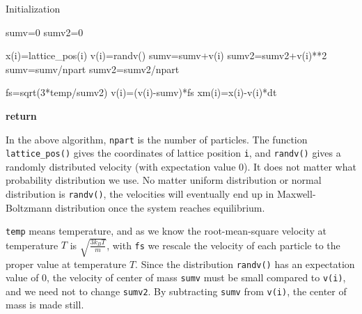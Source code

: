 \documentclass[letterpaper,12pt]{article}
\numberwithin{equation}{section}
\begin{document}
\begin{algorithm}[H]
    \caption{Initialization}
    \begin{algorithmic}[1] %

    
    \State sumv=0 
    \State sumv2=0 

      
        \State x(i)=lattice\_pos(i) 
        \State v(i)=randv() 
        \State sumv=sumv+v(i) 
        \State sumv2=sumv2+v(i)**2 
        \EndFor
        \State sumv=sumv/npart   
        \State sumv2=sumv2/npart 
    \EndProcedure

        \State fs=sqrt(3*temp/sumv2)    
            \State v(i)=(v(i)-sumv)*fs  
            \State xm(i)=x(i)-v(i)*dt  
        \EndFor
    \EndProcedure

    \State \textbf{return}
    \EndFunction
    \end{algorithmic}
\end{algorithm}
In the above algorithm, \texttt{npart} is the number of particles. The function \texttt{lattice\_pos()} gives the coordinates of lattice position \texttt{i}, and \texttt{randv()} gives a randomly distributed velocity (with expectation value 0). It does not matter what probability distribution we use. No matter uniform distribution or normal distribution is \texttt{randv()}, the velocities will eventually end up in Maxwell-Boltzmann distribution once the system reaches equilibrium. 

\texttt{temp} means temperature, and as we know the root-mean-square velocity at temperature $T$ is $\sqrt{\frac{3k_BT}{m}}$, with \texttt{fs} we rescale the velocity of each particle to the proper value at temperature $T$. Since the distribution \texttt{randv()} has an expectation value of 0, the velocity of center of mass \texttt{sumv} must be small compared to \texttt{v(i)}, and we need not to change \texttt{sumv2}. By subtracting \texttt{sumv} from \texttt{v(i)}, the center of mass is made still. 
 
\end{document}
